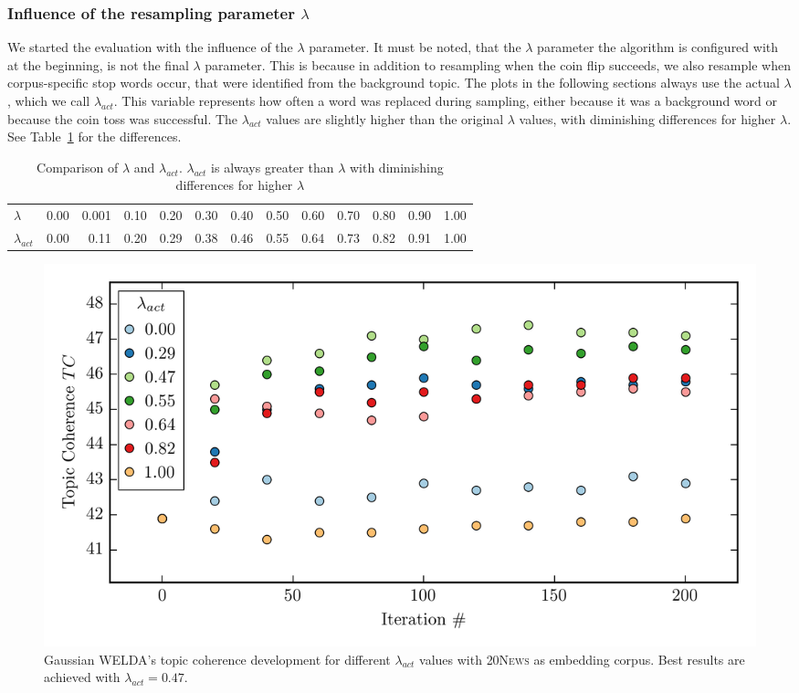 \documentclass[
        a4paper,
        titlepage,
        twoside,
        parskip
        ]{scrbook}
\newcommand{\ra}[1]{\renewcommand{\arraystretch}{#1}}
\theoremstyle{break}
\begin{document}
\subsubsection{Influence of the resampling parameter $\lambda$}
We started the evaluation with the influence of the $\lambda$ parameter.
It must be noted, that the $\lambda$ parameter the algorithm is configured with at the beginning, is not the final $\lambda$ parameter.
This is because in addition to resampling when the coin flip succeeds, we also resample when corpus-specific stop words occur, that were identified from the background topic.
The plots in the following sections always use the actual $\lambda$, which we call $\lambda_{act}$.
This variable represents how often a word was replaced during sampling, either because it was a background word or because the coin toss was successful.
The $\lambda_{act}$ values are slightly higher than the original $\lambda$ values, with diminishing differences for higher $\lambda$. See Table~\ref{table:actual_lambda} for the differences.
\begin{table}[]
  \ra{1.2}
  \centering
  \caption{Comparison of $\lambda$ and $\lambda_{act}$. $\lambda_{act}$ is always greater than $\lambda$ with diminishing differences for higher $\lambda$}
  \label{table:actual_lambda}
  \begin{tabular}{lrrrrrrrrrrrr}
    \toprule
    $\lambda$     & 0.00 & 0.001 & 0.10  & 0.20  & 0.30  & 0.40  & 0.50  & 0.60  & 0.70  & 0.80  & 0.90  & 1.00 \\
    $\lambda_{act}$ & 0.00 & 0.11  & 0.20 & 0.29 & 0.38 & 0.46 & 0.55 & 0.64 & 0.73 & 0.82 & 0.91 & 1.00 \\
    \bottomrule
  \end{tabular}
\end{table}

\begin{figure}
       \centering
       \includegraphics[width=\textwidth]{figures/welda_gaussian_lambda_20news.png}
       \caption{Gaussian WELDA's topic coherence development for different $\lambda_{act}$ values with \textsc{20News} as embedding corpus.
       Best results are achieved with $\lambda_{act} = 0.47$.}
       \label{fig:welda_gaussian_lambda_20news}
\end{figure}
\end{document}
